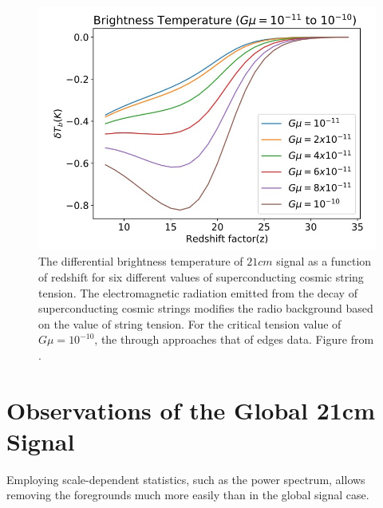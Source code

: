 \documentclass[12pt, TexShade, letterpaper]{report}
\begin{document}
\begin{figure}[h!]
    \centering
    \includegraphics[scale = 0.8]{21cm_cosmic_string.jpg}
    \caption[The global $21cm$ for different values of superconducting cosmic string tension]{The differential brightness temperature of $21cm$ signal as a function of redshift for six different values of superconducting cosmic string tension. The electromagnetic radiation emitted from the decay of superconducting cosmic strings modifies the radio background based on the value of string tension. For the critical tension value of $G\mu = 10 ^{-10}$, the through approaches that of \gls{edges} data. Figure from \cite{cosmic_string_jordan_robert}.}
    \label{fig:21cm_cosmic_string}
\end{figure}

\chapter{Observations of the Global 21cm Signal}
\label{chap:observations}

Employing scale-dependent statistics, such as the power spectrum, allows removing the foregrounds much more easily than in the global signal case.
\end{document}
